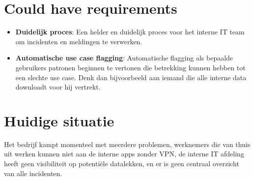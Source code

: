 \section{Could have requirements}
\begin{itemize}
  \item \textbf{Duidelijk proces}: Een helder en duidelijk proces voor het interne IT team om incidenten en meldingen te verwerken. 
  \item \textbf{Automatische use case flagging}: Automatische flagging als bepaalde gebruikers patronen beginnen te vertonen die betrekking kunnen hebben tot een slechte use case. Denk dan bijvoorbeeld aan iemand die alle interne data downloadt voor hij vertrekt.
\end{itemize}

\section{Huidige situatie}
Het bedrijf kampt momenteel met meerdere problemen, werknemers die van thuis uit werken kunnen niet aan de interne apps zonder VPN, de interne IT afdeling heeft geen visibiliteit op potentiële datalekken, en er is geen centraal overzicht van alle incidenten.
